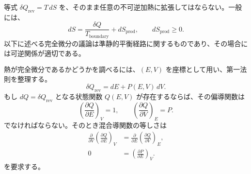 等式 \(\delta Q_{\mathrm{rev}}=T\,dS\) を、そのまま任意の不可逆加熱に拡張してはならない。一般には、
\begin{equation}
 dS=\frac{\delta Q}{T_{\mathrm{boundary}}}+dS_{\mathrm{prod}},
 \qquad dS_{\mathrm{prod}}\ge 0.
 \label{eq:sm6-entropy-production}
\end{equation}
以下に述べる完全微分の議論は準静的平衡経路に関するものであり、その場合には可逆関係が適切である。

\begin{classroomqa}
\end{classroomqa}

熱が完全微分であるかどうかを調べるには、\((E,V)\) を座標として用い、第一法則を整理する。
\begin{equation}
 \delta Q_{\mathrm{rev}}=dE+P(E,V)\,dV.
 \label{eq:sm6-heat-one-form}
\end{equation}
もし \(dQ=\delta Q_{\mathrm{rev}}\) となる状態関数 \(Q(E,V)\) が存在するならば、その偏導関数は
\begin{equation}
 \left(\frac{\partial Q}{\partial E}\right)_V=1,
 \qquad
 \left(\frac{\partial Q}{\partial V}\right)_E=P.
 \label{eq:sm6-hypothetical-heat-derivatives}
\end{equation}
でなければならない。そのとき混合導関数の等しさは
\begin{equation}
 \begin{aligned}
 \frac{\partial}{\partial V}
 \left(\frac{\partial Q}{\partial E}\right)_V
 &=\frac{\partial}{\partial E}
 \left(\frac{\partial Q}{\partial V}\right)_E,\\
 0&=\left(\frac{\partial P}{\partial E}\right)_V.
 \end{aligned}
 \label{eq:sm6-heat-exactness-requirement}
\end{equation}
を要求する。

\begin{classroomqa}
\end{classroomqa}

